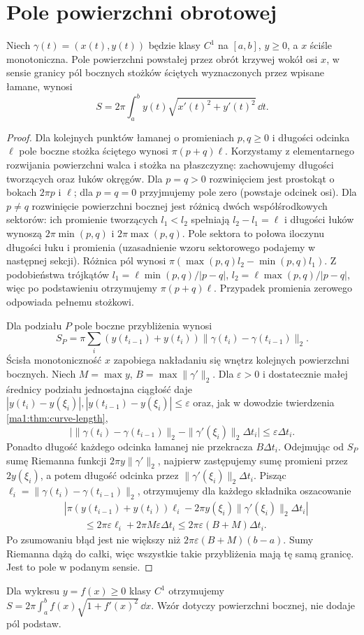 \section{Pole powierzchni obrotowej}
\begin{twierdzenie}
\label{ma1:thm:rotation-surface}
Niech $\gamma(t)=(x(t),y(t))$ będzie klasy $C^1$ na $[a,b]$, $y\ge0$, a $x$ ściśle monotoniczna. Pole powierzchni powstałej przez obrót krzywej wokół osi $x$, w sensie granicy pól bocznych stożków ściętych wyznaczonych przez wpisane łamane, wynosi
\[
 S=2\pi\int_a^b y(t)\sqrt{x'(t)^2+y'(t)^2}\,\dd t.
\]
\end{twierdzenie}
\begin{proof}
Dla kolejnych punktów łamanej o promieniach $p,q\ge0$ i długości odcinka $\ell$ pole boczne stożka ściętego wynosi $\pi(p+q)\ell$. Korzystamy z elementarnego rozwijania powierzchni walca i stożka na płaszczyznę: zachowujemy długości tworzących oraz łuków okręgów. Dla $p=q>0$ rozwinięciem jest prostokąt o bokach $2\pi p$ i $\ell$; dla $p=q=0$ przyjmujemy pole zero (powstaje odcinek osi). Dla $p\ne q$ rozwinięcie powierzchni bocznej jest różnicą dwóch współśrodkowych sektorów: ich promienie tworzących $l_1<l_2$ spełniają $l_2-l_1=\ell$ i długości łuków wynoszą $2\pi\min(p,q)$ i $2\pi\max(p,q)$. Pole sektora to połowa iloczynu długości łuku i promienia (uzasadnienie wzoru sektorowego podajemy w następnej sekcji). Różnica pól wynosi $\pi(\max(p,q)l_2-\min(p,q)l_1)$. Z podobieństwa trójkątów $l_1=\ell\min(p,q)/|p-q|$, $l_2=\ell\max(p,q)/|p-q|$, więc po podstawieniu otrzymujemy $\pi(p+q)\ell$. Przypadek promienia zerowego odpowiada pełnemu stożkowi.

Dla podziału $P$ pole boczne przybliżenia wynosi
\[
 S_P=\pi\sum_i(y(t_{i-1})+y(t_i))\|\gamma(t_i)-\gamma(t_{i-1})\|_2.
\]
Ścisła monotoniczność $x$ zapobiega nakładaniu się wnętrz kolejnych powierzchni bocznych. Niech $M=\max y$, $B=\max\|\gamma'\|_2$. Dla $\varepsilon>0$ i dostatecznie małej średnicy podziału jednostajna ciągłość daje $|y(t_i)-y(\xi_i)|,|y(t_{i-1})-y(\xi_i)|\le\varepsilon$ oraz, jak w dowodzie twierdzenia \ref{ma1:thm:curve-length},
\[
 \big|\|\gamma(t_i)-\gamma(t_{i-1})\|_2-\|\gamma'(\xi_i)\|_2\Delta t_i\big|
 \le\varepsilon\Delta t_i.
\]
Ponadto długość każdego odcinka łamanej nie przekracza $B\Delta t_i$. Odejmując od $S_P$ sumę Riemanna funkcji $2\pi y\|\gamma'\|_2$, najpierw zastępujemy sumę promieni przez $2y(\xi_i)$, a potem długość odcinka przez $\|\gamma'(\xi_i)\|_2\Delta t_i$. Pisząc $\ell_i=\|\gamma(t_i)-\gamma(t_{i-1})\|_2$, otrzymujemy dla każdego składnika oszacowanie
\[
 \begin{split}
 &|\pi(y(t_{i-1})+y(t_i))\ell_i-2\pi y(\xi_i)\|\gamma'(\xi_i)\|_2\Delta t_i|\\
 &\qquad\le 2\pi\varepsilon\ell_i+2\pi M\varepsilon\Delta t_i
 \le 2\pi\varepsilon(B+M)\Delta t_i.
 \end{split}
\]
Po zsumowaniu błąd jest nie większy niż $2\pi\varepsilon(B+M)(b-a)$. Sumy Riemanna dążą do całki, więc wszystkie takie przybliżenia mają tę samą granicę. Jest to pole w podanym sensie.
\end{proof}
Dla wykresu $y=f(x)\ge0$ klasy $C^1$ otrzymujemy $S=2\pi\int_a^b f(x)\sqrt{1+f'(x)^2}\,\dd x$. Wzór dotyczy powierzchni bocznej, nie dodaje pól podstaw.

